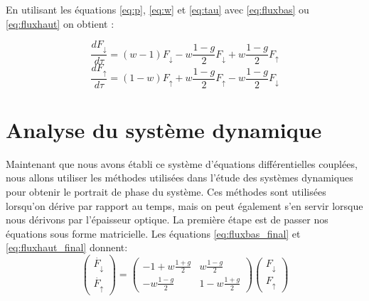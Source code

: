 \documentclass[12pt]{article}
\begin{document}
En utilisant les équations \ref{eq:p}, \ref{eq:w} et \ref{eq:tau} avec \ref{eq:fluxbas} ou \ref{eq:fluxhaut} on obtient :

\begin{equation}
    \frac{dF_{\downarrow}}{d\tau}= (w-1)F_{\downarrow}-w \frac{1-g}{2} F_{\downarrow} + w \frac{1-g}{2} F_{\uparrow}
    \label{eq:fluxbas_final}
\end{equation}
\begin{equation}
    \frac{dF_{\uparrow}}{d\tau}=(1-w)F_{\uparrow}+w \frac{1-g}{2} F_{\uparrow} - w \frac{1-g}{2} F_{\downarrow}
    \label{eq:fluxhaut_final}
\end{equation}

\section{Analyse du système dynamique}
Maintenant que nous avons établi ce système d'équations différentielles couplées, nous allons utiliser les méthodes utilisées dans l'étude des systèmes dynamiques \cite{systemdynamique} pour obtenir le portrait de phase du système. Ces méthodes sont utilisées lorsqu'on dérive par rapport au temps, mais on peut également s'en servir lorsque nous dérivons par l'épaisseur optique. La première étape est de passer nos équations sous forme matricielle. Les équations \ref{eq:fluxbas_final} et \ref{eq:fluxhaut_final} donnent: 
\begin{equation}
    \begin{pmatrix}
        \dot{F_{\downarrow}} \\
        \dot{F_{\uparrow}}
    \end{pmatrix}
    =
    \begin{pmatrix}
        -1+w \frac{1+g}{2} &  w \frac{1-g}{2} \\
        - w \frac{1-g}{2} & 1-w \frac{1+g}{2}
    \end{pmatrix}
    \begin{pmatrix}
        F_{\downarrow}\\
        F_{\uparrow}
    \end{pmatrix}
    \label{eq:flux_matricielle}
\end{equation}\par
\end{document}
